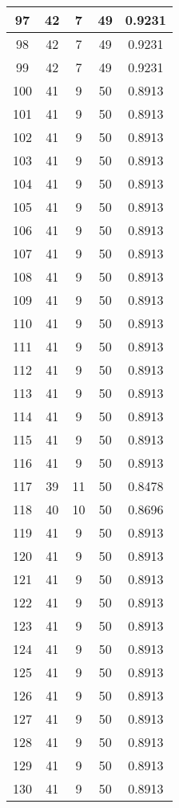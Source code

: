 \documentclass[letterpaper, 12pt]{article}
\begin{document}
\begin{longtable}{|c|c|c|c|c|}
\hline
97 & 42 & 7 & 49 & 0.9231 \\
\hline
98 & 42 & 7 & 49 & 0.9231 \\
\hline
99 & 42 & 7 & 49 & 0.9231 \\
\hline
100 & 41 & 9 & 50 & 0.8913 \\
\hline
101 & 41 & 9 & 50 & 0.8913 \\
\hline
102 & 41 & 9 & 50 & 0.8913 \\
\hline
103 & 41 & 9 & 50 & 0.8913 \\
\hline
104 & 41 & 9 & 50 & 0.8913 \\
\hline
105 & 41 & 9 & 50 & 0.8913 \\
\hline
106 & 41 & 9 & 50 & 0.8913 \\
\hline
107 & 41 & 9 & 50 & 0.8913 \\
\hline
108 & 41 & 9 & 50 & 0.8913 \\
\hline
109 & 41 & 9 & 50 & 0.8913 \\
\hline
110 & 41 & 9 & 50 & 0.8913 \\
\hline
111 & 41 & 9 & 50 & 0.8913 \\
\hline
112 & 41 & 9 & 50 & 0.8913 \\
\hline
113 & 41 & 9 & 50 & 0.8913 \\
\hline
114 & 41 & 9 & 50 & 0.8913 \\
\hline
115 & 41 & 9 & 50 & 0.8913 \\
\hline
116 & 41 & 9 & 50 & 0.8913 \\
\hline
117 & 39 & 11 & 50 & 0.8478 \\
\hline
118 & 40 & 10 & 50 & 0.8696 \\
\hline
119 & 41 & 9 & 50 & 0.8913 \\
\hline
120 & 41 & 9 & 50 & 0.8913 \\
\hline
121 & 41 & 9 & 50 & 0.8913 \\
\hline
122 & 41 & 9 & 50 & 0.8913 \\
\hline
123 & 41 & 9 & 50 & 0.8913 \\
\hline
124 & 41 & 9 & 50 & 0.8913 \\
\hline
125 & 41 & 9 & 50 & 0.8913 \\
\hline
126 & 41 & 9 & 50 & 0.8913 \\
\hline
127 & 41 & 9 & 50 & 0.8913 \\
\hline
128 & 41 & 9 & 50 & 0.8913 \\
\hline
129 & 41 & 9 & 50 & 0.8913 \\
\hline
130 & 41 & 9 & 50 & 0.8913 \\

\end{longtable}
\end{document}
